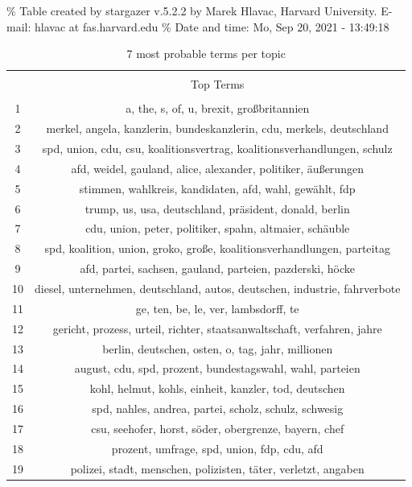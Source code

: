 \documentclass[
]{article}
\begin{document}
\% Table created by stargazer v.5.2.2 by Marek Hlavac, Harvard
University. E-mail: hlavac at fas.harvard.edu \% Date and time: Mo, Sep
20, 2021 - 13:49:18

\begin{table}[!htbp] \centering 
  \caption{7 most probable terms per topic} 
  \label{table:top_terms} 
\begin{tabular}{@{\extracolsep{5pt}} cc} 
\\[-1.8ex]\hline 
\hline \\[-1.8ex] 
 & Top Terms \\ 
\hline \\[-1.8ex] 
1 & a, the, s, of, u, brexit, großbritannien \\ 
2 & merkel, angela, kanzlerin, bundeskanzlerin, cdu, merkels, deutschland \\ 
3 & spd, union, cdu, csu, koalitionsvertrag, koalitionsverhandlungen, schulz \\ 
4 & afd, weidel, gauland, alice, alexander, politiker, äußerungen \\ 
5 & stimmen, wahlkreis, kandidaten, afd, wahl, gewählt, fdp \\ 
6 & trump, us, usa, deutschland, präsident, donald, berlin \\ 
7 & cdu, union, peter, politiker, spahn, altmaier, schäuble \\ 
8 & spd, koalition, union, groko, große, koalitionsverhandlungen, parteitag \\ 
9 & afd, partei, sachsen, gauland, parteien, pazderski, höcke \\ 
10 & diesel, unternehmen, deutschland, autos, deutschen, industrie, fahrverbote \\ 
11 & ge, ten, be, le, ver, lambsdorff, te \\ 
12 & gericht, prozess, urteil, richter, staatsanwaltschaft, verfahren, jahre \\ 
13 & berlin, deutschen, osten, o, tag, jahr, millionen \\ 
14 & august, cdu, spd, prozent, bundestagswahl, wahl, parteien \\ 
15 & kohl, helmut, kohls, einheit, kanzler, tod, deutschen \\ 
16 & spd, nahles, andrea, partei, scholz, schulz, schwesig \\ 
17 & csu, seehofer, horst, söder, obergrenze, bayern, chef \\ 
18 & prozent, umfrage, spd, union, fdp, cdu, afd \\ 
19 & polizei, stadt, menschen, polizisten, täter, verletzt, angaben \\ 

\end{tabular}
\end{table}
\end{document}
